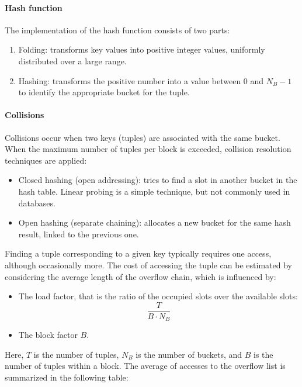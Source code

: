 \paragraph*{Hash function}
The implementation of the hash function consists of two parts:
\begin{enumerate}
    \item Folding: transforms key values into positive integer values, uniformly distributed over a large range.
    \item Hashing: transforms the positive number into a value between $0$ and $N_B-1$ to identify the appropriate bucket for the tuple.
\end{enumerate}

\paragraph*{Collisions}
Collisions occur when two keys (tuples) are associated with the same bucket. 
When the maximum number of tuples per block is exceeded, collision resolution techniques are applied:
\begin{itemize}
    \item Closed hashing (open addressing): tries to find a slot in another bucket in the hash table.
        Linear probing is a simple technique, but not commonly used in databases.
    \item Open hashing (separate chaining): allocates a new bucket for the same hash result, linked to the previous one.
\end{itemize}
Finding a tuple corresponding to a given key typically requires one access, although occasionally more. 
The cost of accessing the tuple can be estimated by considering the average length of the overflow chain, which is influenced by:
\begin{itemize}
    \item The load factor, that is the ratio of the occupied slots over the available slots:
        \[\dfrac{T}{B \cdot N_B}\]
    \item The block factor $B$. 
\end{itemize}
Here, $T$ is the number of tuples, $N_B$ is the number of buckets, and $B$ is the number of tuples within a block. 
The average of accesses to the overflow list is summarized in the following table: 
